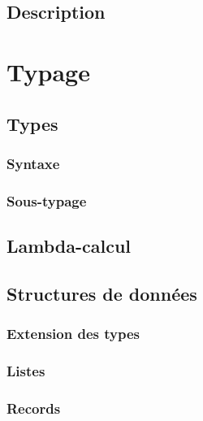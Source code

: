 \documentclass[frenchb]{scrartcl}
\newcommand{\τ}{\ensuremath{\tau}}
\begin{document}
\subsection{Description}

\section{Typage}

\subsection{Types}

\subsubsection{Syntaxe}
\subsubsection{Sous-typage}

\subsection{Lambda-calcul}

\subsection{Structures de données}

\subsubsection{Extension des types}

\subsubsection{Listes}

\subsubsection{Records}
\end{document}
